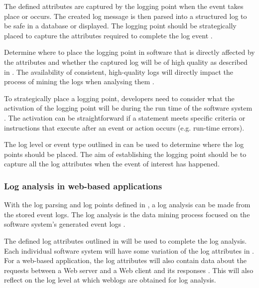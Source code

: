 The defined attributes are captured by the logging point when the event takes place or occurs. The created log message is then parsed into a structured log to be safe in a database or displayed. The logging point should be strategically placed to capture the attributes required to complete the log event \cite{Fedaghi2010}.\par Determine where to place the logging point in software that is directly affected by the attributes and whether the captured log will be of high quality as described in . The availability of consistent, high-quality logs will directly impact the process of mining the logs when analysing them \cite{Kherbouche2017}. \par To strategically place a logging point, developers need to consider what the activation of the logging point will be during the run time of the software system \cite{Pecchia2015, Cinque2013}. The activation can be straightforward if a statement meets specific criteria or instructions that execute after an event or action occurs (e.g. run-time errors). \par The log level or event type outlined in  can be used to determine where the log points should be placed. The aim of establishing the logging point should be to capture all the log attributes when the event of interest has happened.

\subsubsection{Log analysis in web-based applications}
With the log parsing and log points defined in , a log analysis can be made from the stored event logs. The log analysis is the data mining process focused on the software system's generated event logs \cite{Slaninova2014,Hasiloglu2018}. \par The defined log attributes outlined in  will be used to complete the log analysis. Each individual software system will have some variation of the log attributes in . For a web-based application, the log attributes will also contain data about the requests between a Web server and a Web client and its responses \cite{Slaninova2014, Dhanalakshmi2016}. This will also reflect on the log level at which weblogs are obtained for log analysis.


